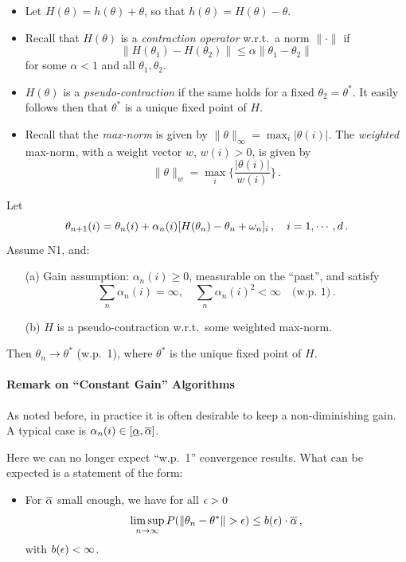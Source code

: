 \begin{itemize}
\item
Let $H(\theta) = h(\theta) + \theta$, so that $h(\theta) = H(\theta) - \theta$.
\item
Recall that $H(\theta)$ is a {\em contraction operator} w.r.t.\ a norm
$\|\cdot\|$ if
$$
\| H(\theta_1) - H(\theta_2)\| \le \alpha \| \theta_1 - \theta_2\|
$$
for some $\alpha < 1$ and all $\theta_1, \theta_2$.
\item
$H(\theta)$ is a {\em pseudo-contraction} if the same holds for a
fixed $\theta_2=\theta^*$.
It easily follows then that $\theta^*$ is a unique fixed point of $H$.
\item
Recall that the {\em max-norm} is given by
$\|\theta\|_\infty = \max_i |\theta(i)|$.
The {\em weighted} max-norm, with a weight vector $w$, $w(i) > 0$, is given by
$$
\|\theta\|_w = \max_i \{ \frac{|\theta(i)|}{w(i)}\}
\,.
$$
\end{itemize}

\begin{theorem}[Prop. 4.4. in B.\&T.]\label{thm:SA_2}
Let
$$
\theta_{n+1}(i) = \theta_n(i) + \alpha_n (i)  [H(\theta_n) - \theta_n +
\omega_n]_i\,, \quad i=1, \cdots, d\,.
$$
Assume N1, and:
\begin{itemize}
\item[(a)]
Gain assumption: $\alpha_n(i) \ge 0$, measurable on the ``past'', and satisfy
$$
\sum_n \alpha_n(i) = \infty, \quad \sum_n \alpha_n(i)^2 < \infty \quad
\text{(w.p. 1)}\,.
$$
\item[(b)]
$H$ is a pseudo-contraction w.r.t.\ some weighted max-norm.
\end{itemize}
Then $\theta_n \to \theta^*$ (w.p.\  1), where $\theta^*$ is the unique fixed point
of $H$.
\end{theorem}



\paragraph{Remark on ``Constant Gain'' Algorithms}

As noted before, in practice it is often desirable to keep a non-diminishing
gain.
A typical case is $ \alpha_n(i)\in [\underline\alpha, \overline{\alpha}]$.

Here we can no longer expect ``w.p.\   1'' convergence results.  What can be
expected is a statement of the form:
\begin{itemize}
\item
For $\overline\alpha$ small enough, we have for all $\epsilon > 0$
$$
\limsup_{n \to \infty} P (\|\theta_n - \theta^* \| > \epsilon) \le b(\epsilon) \cdot
\overline\alpha\,,
$$
with $b(\epsilon) < \infty$.
\end{itemize}

